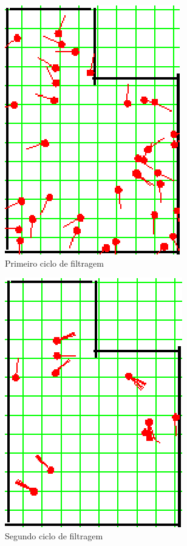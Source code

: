 \begin{figure}[H]
  \centering
  \includegraphics[scale=1]{figuras/cen2_ex1/2.eps}
  \caption[Primeiro Ciclo de Filtragem]{Primeiro ciclo de filtragem}
  \label{img:cen2_ex1_2}
\end{figure}

\begin{figure}[H]
  \centering
  \includegraphics[scale=1]{figuras/cen2_ex1/3.eps}
  \caption[Segundo Ciclo de Filtragem]{Segundo ciclo de filtragem}
  \label{img:cen2_ex1_3}
\end{figure}

